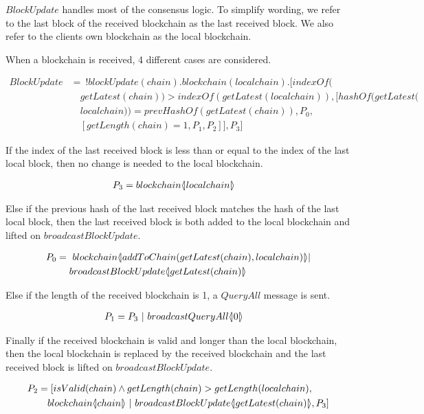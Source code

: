 $BlockUpdate$ handles most of the consensus logic.
To simplify wording, we refer to the last block of the received blockchain as the last received block.
We also refer to the clients own blockchain as the local blockchain.

When a blockchain is received, 4 different cases are considered.

\begin{align*}
	BlockUpdate &=\ !blockUpdate(chain).blockchain(localchain).[indexOf(\\
	&\quad getLatest(chain))>indexOf(getLatest(localchain)),[hashOf(getLatest(\\
	&\quad localchain))=prevHashOf(getLatest(chain)),P_0,\\
	&\quad [getLength(chain)=1,P_1,P_2]],P_3]
\end{align*}

If the index of the last received block is less than or equal to the index of the last local block, then no change is needed to the local blockchain.

\begin{align*}
	P_3 &= blockchain \langle \! | localchain | \! \rangle
\end{align*}

Else if the previous hash of the last received block matches the hash of the last local block, then the last received block is both added to the local blockchain and lifted on $broadcastBlockUpdate$.

\begin{align*}
    P_0 &=\ blockchain\lift{}{addToChain(getLatest(chain),localchain)}|\\
    &\quad \ broadcastBlockUpdate\lift{}{getLatest(chain)}
\end{align*}

Else if the length of the received blockchain is 1, a $QueryAll$ message is sent.

\begin{align*}
    P_1 &= P_3\ |\ broadcastQueryAll  \langle \! | 0 | \! \rangle
\end{align*}

Finally if the received blockchain is valid and longer than the local blockchain, then the local blockchain is replaced by the received blockchain and the last received block is lifted on $broadcastBlockUpdate$.

\begin{align*}
    P_2 &= [isValid(chain) \land getLength(chain) > getLength(localchain),\\
    &\quad blockchain \langle \! | chain | \! \rangle\ |\ broadcastBlockUpdate  \langle \! | getLatest(chain) | \! \rangle,P_3]
\end{align*}


